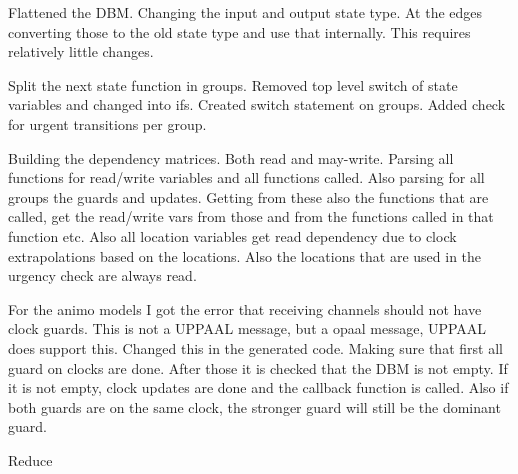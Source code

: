 Flattened the DBM. Changing the input and output state type. At the edges converting those to the old state type and use that internally. This requires relatively little changes. 

Split the next state function in groups. Removed top level switch of state variables and changed into ifs. Created switch statement on groups. Added check for urgent transitions per group.

Building the dependency matrices. Both read and may-write. Parsing all functions for read/write variables and all functions called. Also parsing for all groups the guards and updates. Getting from these also the functions that are called, get the read/write vars from those and from the functions called in that function etc. Also all location variables get read dependency due to clock extrapolations based on the locations. Also the locations that are used in the urgency check are always read. 

For the animo models I got the error that receiving channels should not have clock guards. This is not a UPPAAL message, but a opaal message, UPPAAL does support this. Changed this in the generated code. Making sure that first all guard on clocks are done. After those it is checked that the DBM is not empty. If it is not empty, clock updates are done and the callback function is called. Also if both guards are on the same clock, the stronger guard will still be the dominant guard.

\begin{algorithm}
\caption{Reduce}\label{alg:Reduce}
\begin{algorithmic}[1]
					\EndIf
				\EndIf
			\EndFor
		\EndFor
	\EndFor				
\EndProcedure
\end{algorithmic}
\end{algorithm}

